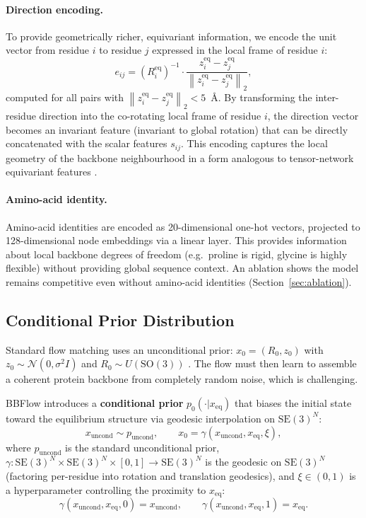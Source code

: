 \documentclass[12pt,a4paper]{article}
\newcommand{\xeq}{x_{\mathrm{eq}}}
\newcommand{\SE}{\mathrm{SE}(3)}
\newcommand{\SOthree}{\mathrm{SO}(3)}
\newcommand{\puncond}{p_{\mathrm{uncond}}}
\newcommand{\norm}[1]{\left\|#1\right\|}
\begin{document}
\paragraph{Direction encoding.}
To provide geometrically richer, equivariant information, we encode the unit vector from
residue $i$ to residue $j$ expressed in the local frame of residue $i$:
\begin{equation}
  \label{eq:dir_enc}
  e_{ij} = (R^{\mathrm{eq}}_i)^{-1} \cdot \frac{z^{\mathrm{eq}}_i - z^{\mathrm{eq}}_j}
    {\norm{z^{\mathrm{eq}}_i - z^{\mathrm{eq}}_j}_2},
\end{equation}
computed for all pairs with $\norm{z^{\mathrm{eq}}_i - z^{\mathrm{eq}}_j}_2 < 5$~Å.
By transforming the inter-residue direction into the co-rotating local frame of residue $i$,
the direction vector becomes an invariant feature (invariant to global rotation) that can be
directly concatenated with the scalar features $s_{ij}$.  This encoding captures the local
geometry of the backbone neighbourhood in a form analogous to tensor-network equivariant
features \citep{schutt2021}.

\paragraph{Amino-acid identity.}
Amino-acid identities are encoded as 20-dimensional one-hot vectors, projected to 128-dimensional
node embeddings via a linear layer.  This provides information about local backbone degrees of
freedom (e.g.\ proline is rigid, glycine is highly flexible) without providing global sequence
context.  An ablation shows the model remains competitive even without amino-acid identities
(Section~\ref{sec:ablation}).

\subsection{Conditional Prior Distribution}
\label{sec:cond_prior}

Standard flow matching uses an unconditional prior:
$x_0 = (R_0, z_0)$ with $z_0 \sim \mathcal{N}(0, \sigma^2 I)$ and
$R_0 \sim U(\SOthree)$ \citep{yim2023frameflow}.  The flow must then learn to assemble a
coherent protein backbone from completely random noise, which is challenging.

BBFlow introduces a \textbf{conditional prior} $p_0(\cdot | \xeq)$ that biases the initial
state toward the equilibrium structure via geodesic interpolation on $\SE^N$:
\begin{equation}
  \label{eq:cond_prior}
  x_{\mathrm{uncond}} \sim \puncond, \qquad x_0 = \gamma(x_{\mathrm{uncond}}, \xeq, \xi),
\end{equation}
where $\puncond$ is the standard unconditional prior, $\gamma: \SE^N \times \SE^N \times [0,1]
\to \SE^N$ is the geodesic on $\SE^N$ (factoring per-residue into rotation and translation
geodesics), and $\xi \in (0,1)$ is a hyperparameter controlling the proximity to $\xeq$:
\begin{equation}
  \gamma(x_{\mathrm{uncond}}, \xeq, 0) = x_{\mathrm{uncond}}, \qquad
  \gamma(x_{\mathrm{uncond}}, \xeq, 1) = \xeq.
\end{equation}
\end{document}
